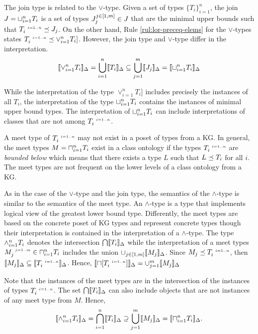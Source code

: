 \documentclass[runningheads]{llncs}
\newcommand{\s}{\scriptscriptstyle\ \,}
\newcommand{\llb}{\llbracket}
\newcommand{\rrb}{\rrbracket}
\begin{document}
The join type is related to the $\lor$-type. Given a set of types
$\{T_i\}_{i=1}^n$, the join $J=\sqcup_{i=1}^n\/T_i$ is a set of types
$J_j^{j\in[1,m]}\in\/J$ that are the minimal upper bounds such that
$T_i^{\s\/i=1..n}\preceq\/J_j$. On the other hand, Rule
\ref{rul:lor-preceq-elems} for the $\lor$-types states
$T_i^{\s\/i=1..n}\preceq\lor_{i=1}^n\/T_i]$. However, the join type and $\lor$-type
differ in the interpretation.
$$\llb\lor_{i=1}^n\/T_i\rrb_\D=\bigcup_{i=1}^n\llb\/T_i\rrb_\D\subseteq\bigcup_{j=1}^m\llb\/J_j\rrb_\D=\llb\sqcup_{i=1}^n\/T_i\rrb_\D$$

While the interpretation of the type $\lor_{i=1}^nT_i]$ includes
precisely the instances of all $T_i$, the interpretation of the type
$\sqcup_{i=1}^n\/T_i$ contains the instances of minimal upper bound
types. The interpretation of $\sqcup_{i=1}^n\/T_i$ can include
interpretations of classes that are not among $T_i^{\s\/i=1..n}$.

A meet type of $T_i^{\s\/i=1..n}$ may not exist in a poset of types
from a KG. In general, the meet types $M=\sqcap_{i=1}^n\/T_i$
exist in a class ontology if the types $T_i^{\s\/i=1..n}$ are
\emph{bounded below} \cite{Pierce2002} which means that there exists a
type $L$ such that $L\preceq\/T_i$ for all $i$. The meet types are not
frequent on the lower levels of a class ontology from a KG.

As in the case of the $\lor$-type and the join type, the semantics of
the $\land$-type is similar to the semantics of the meet type. An
$\land$-type is a type that implements logical view of the greatest
lower bound type. Differently, the meet types are based on the
concrete poset of KG types and represent concrete types though their
interpretation is contained in the interpretation of a
$\land$-type. The type $\land_{i=1}^n\/T_i$ denotes the intersection
$\bigcap\/\llb\/T_i\rrb_\D$ while the interpretation of a meet types
$M_j^{\s\/j=1..m}\in\sqcap_{i=1}^n\/T_i$ includes the union
$\cup_{j\in[1,m]}\llb\/M_j\rrb_\D$. Since
$M_j\preceq\/T_i^{\s\/i=1..n}$, then
$\llb\/M_j\rrb_\D\subseteq\llb\/T_i^{\s\/i=1..n}\rrb_\D$. Hence,
$\llb\sqcap[T_i^{\s\/i=1..n}]\rrb_\D=\cup_{j=1}^m\llb\/M_j\rrb_\D$

Note that the instances of the meet types
are in the intersection of the instances of types
$T_i^{\s\/i=1..n}$. The set $\bigcap\/\llb\/T_i\rrb_\D$ can also
include objects that are not instances of any meet type from
$M$. Hence,
$$\llb\land_{i=1}^n\/T_i\rrb_\D=\bigcap_{i=1}^n\llb\/T_i\rrb_\D\supseteq\bigcup_{j=1}^m\llb\/M_j\rrb_\D=\llb\sqcap_{i=1}^n\/T_i\rrb_\D.$$
\end{document}
